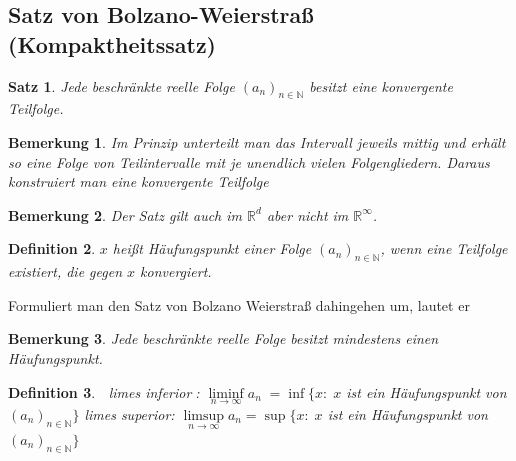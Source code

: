 \documentclass[12pt,a4paper]{report}%
\newtheorem{satz}{Satz}[section]
\newtheorem{definition}[satz]{Definition}
\newtheorem{bem}{Bemerkung}[section]
\numberwithin{equation}{section}
\newcommand{\R}{\mathbb{R}} %
\newcommand{\N}{\mathbb{N}}
\numberwithin{equation}{subsection}
\begin{document}
  \subsection{Satz von Bolzano-Weierstraß (Kompaktheitssatz)}
  \begin{satz}
    Jede beschränkte reelle Folge $(a_n)_{n \in \N}$ besitzt eine konvergente Teilfolge.
  \end{satz}
  \begin{bem}
    Im Prinzip unterteilt man das Intervall jeweils mittig und erhält so eine Folge von Teilintervalle mit je unendlich vielen Folgengliedern. Daraus konstruiert man eine konvergente Teilfolge
  \end{bem}  
  \begin{bem}
    Der Satz gilt auch im $\R^d$ aber nicht im $\R^{\infty}$.
  \end{bem}
  \begin{definition}
    $x$ heißt Häufungspunkt einer Folge $(a_n)_{n \in \N}$, wenn eine Teilfolge existiert, die gegen $x$ konvergiert.
  \end{definition}
  Formuliert man den Satz von Bolzano Weierstraß dahingehen um, lautet er
  \begin{bem}
    Jede beschränkte reelle Folge besitzt mindestens einen Häufungspunkt.
  \end{bem}
  \begin{definition}$\;$\newline 
    limes inferior$\;$: $\liminf\limits_{n\rightarrow \infty} a_n \;= \inf\lbrace x:\; x$ ist ein Häufungspunkt von $(a_n)_{n \in \N}\rbrace$ \newline
    limes superior: $\limsup\limits_{n\rightarrow \infty} a_n = \sup\lbrace x:\; x$ ist ein Häufungspunkt von $(a_n)_{n \in \N}\rbrace$
  \end{definition}
  
\end{document}
